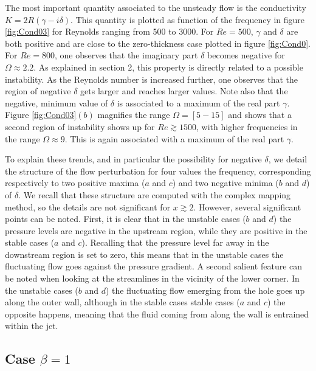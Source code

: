 \documentclass{jfm}
\begin{document}
The most important quantity associated to the unsteady flow is the conductivity $K = 2R (\gamma-i \delta)$. This quantity is plotted as function of the frequency in figure \ref{fig:Cond03} for Reynolds ranging from 500 to 3000.
For $Re = 500$, $\gamma$ and $\delta$ are both positive and are close to the zero-thickness case plotted in figure \ref{fig:Cond0}. For $Re= 800$, one observes that the imaginary part $\delta$ becomes negative for 
$\Omega \approx 2.2$. As explained in section 2, this property is directly related to a possible instability. As the Reynolds number is increased further, one observes that the region of negative $\delta$ gets larger and reaches larger values. Note also that the negative, minimum value of $\delta$ is associated to a maximum of the real part $\gamma$. 
Figure \ref{fig:Cond03}$(b)$ magnifies the range $\Omega = [5-15]$ and shows that a second region of instability shows up for $Re \gtrsim 1500$, with higher frequencies in the range $\Omega \approx 9$. This is again associated with a maximum of the real part $\gamma$.

To explain these trends, and in particular the possibility for negative $\delta$, we detail the structure of the flow perturbation for four values the frequency, corresponding respectively to two positive maxima ($a$ and $c$)
 and two negative minima  ($b$ and $d$) of $\delta$. We recall that these structure are computed with the complex mapping method, so the details are not significant for $x \gtrsim 2$. However, several significant points can be noted. First, it is clear that in the unstable cases ($b$ and $d$) the pressure levels are negative in the upstream region, while they are positive in the stable cases ($a$ and $c$). Recalling that the pressure level far away in the downstream region is set to zero, this means that in the unstable cases the fluctuating flow goes against the pressure gradient. A second salient feature can be noted when looking at the streamlines in the vicinity
 of the lower corner. In the unstable cases ($b$ and $d$) the fluctuating flow emerging from the hole goes up along the outer wall, although in the stable cases stable cases ($a$ and $c$) the opposite happens, meaning that the fluid coming from along the wall is entrained within the jet.






\subsection{Case $\beta = 1$}
\end{document}
